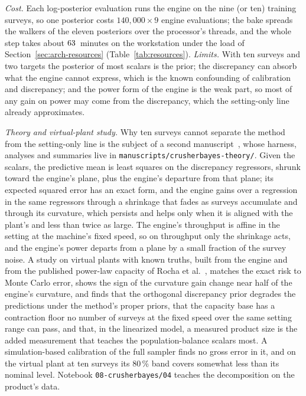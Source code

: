 \emph{Cost.} Each log-posterior evaluation runs the engine on the nine (or ten) training surveys, so one posterior costs $140{,}000\times9$ engine
evaluations; the bake spreads the walkers of the eleven posteriors over the processor's threads, and the whole step takes about
$63$~minutes on the workstation under the load of Section~\ref{sec:arch-resources} (Table~\ref{tab:resources}). \emph{Limits.} With ten surveys and two targets the
posterior of most scalars is the prior; the discrepancy can absorb what the engine cannot express, which is the known confounding of calibration
and discrepancy; and the power form of the engine is the weak part, so most of any gain on power may come from the discrepancy, which the
setting-only line already approximates.

\emph{Theory and virtual-plant study.} Why ten surveys cannot separate the method from the setting-only line is the subject of a second
manuscript~\cite{cbtheory2026}, whose harness, analyses and summaries live in \texttt{manuscripts/\allowbreak{}crusherbayes-theory/}. Given the
scalars, the predictive mean is least squares on the discrepancy regressors, shrunk toward the engine's plane, plus the engine's departure from that
plane; its expected squared error has an exact form, and the engine gains over a regression in the same regressors through a shrinkage that fades as
surveys accumulate and through its curvature, which persists and helps only when it is aligned with the plant's and less than twice as large. The
engine's throughput is affine in the setting at the machine's fixed speed, so on throughput only the shrinkage acts, and the engine's power departs
from a plane by a small fraction of the survey noise. A study on virtual plants with known truths, built from the engine and from the published
power-law capacity of Rocha et al.~\cite{rocha2024}, matches the exact risk to Monte Carlo error, shows the sign of the curvature gain change near half of
the engine's curvature, and finds that the orthogonal discrepancy prior degrades the predictions under the method's proper priors, that the capacity
base has a contraction floor no number of surveys at the fixed speed over the same setting range can pass, and that, in the linearized model, a
measured product size is the added measurement that teaches the population-balance scalars most. A simulation-based calibration of the full sampler
finds no gross error in it, and on the virtual plant at ten surveys its 80\,\% band covers somewhat less than its nominal level. Notebook \texttt{08-crusherbayes/04} teaches the decomposition on the product's data.


